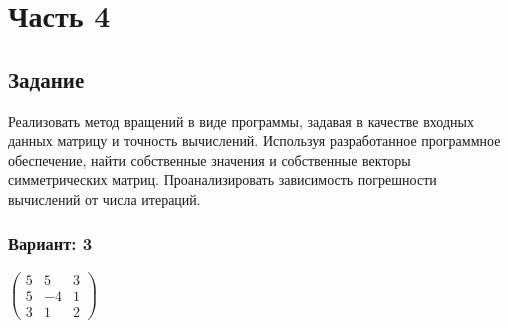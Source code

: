 \chapter*{Часть 4}

\section*{Задание}
Реализовать метод вращений в виде программы, задавая в качестве входных данных матрицу
и точность вычислений. Используя разработанное программное обеспечение, найти
собственные значения и собственные векторы симметрических матриц. Проанализировать
зависимость погрешности вычислений от числа итераций.

\subsection*{Вариант: 3}


$\begin{pmatrix}
    5 & 5 & 3 \\
    5 & -4 & 1 \\
    3 & 1 & 2
\end{pmatrix}$

\pagebreak